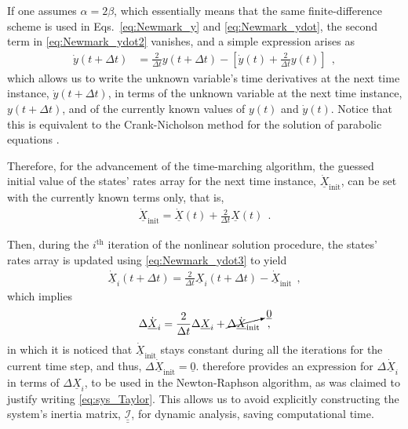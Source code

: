 \documentclass[12pt,a4paper,oneside,english]{abntex2} %
\newcommand{\vect}[1]{\underline{#1}}
\def\tens#1{\underline{\underline{#1}}}
\def\lb{\left[}
\def\rb{\right]}
\def\zv{\vect{0}}
\def\X{\vect{X}}
\def\Xi{\X_i}
\def\Xdot{\dot{\X}}
\def\Xdoti{\dot{\X}_i}
\def\MassSys{\tens{\mathcal{I}}}
\def\dt{\Delta t}
\def\ydot{\dot{y}}
\def\todt{\frac{2}{\dt}}
\def\dt{\Delta t}
\begin{document}
If one assumes $\alpha = 2\beta$, which essentially means that the same finite-difference scheme is used in Eqs.~\eqref{eq:Newmark_y} and \eqref{eq:Newmark_ydot}, the second term in \cref{eq:Newmark_ydot2} vanishes, and a simple expression arises as
\begin{align}
    \ydot(t+\dt) &= \todt y(t+\dt) - \lb \ydot(t) + \todt y(t) \rb \ \ ,
    \label{eq:Newmark_ydot3}
\end{align}
which allows us to write the unknown variable's time derivatives at the next time instance, $\ydot(t+\dt)$, in terms of the unknown variable at the next time instance, $y(t+\dt)$, and of the currently known values of $y(t)$ and $\ydot(t)$. Notice that this is equivalent to the Crank-Nicholson method for the solution of parabolic equations \cite{reddy2014introduction}.

Therefore, for the advancement of the time-marching algorithm, the guessed initial value of the states' rates array for the next time instance, $\Xdot_{\text{init}}$, can be set with the currently known terms only, that is,
\begin{align}
    \Xdot_{\text{init}} =  \Xdot(t)+\todt\X(t) \ \ .
    \label{eq:Xdot_init}
\end{align}

Then, during the $i^{\text{th}}$ iteration of the nonlinear solution procedure, the states' rates array is updated using \cref{eq:Newmark_ydot3} to yield
\begin{align}
    \Xdoti(t+\dt) = \todt\Xi(t+\dt) - \Xdot_{\text{init}} \ \ ,
    \label{eq:Xdot_update}
\end{align}
which implies
\begin{align}
    \Delta\Xdoti = \todt\Delta\Xi + \cancelto{\zv}{\Delta\Xdot_{\text{init}}} \ \ ,
    \label{eq:DeltaXdoti}
\end{align}
in which it is noticed that $\Xdot_{\text{init}}$ stays constant during all the iterations for the current time step, and thus, $\Delta\Xdot_{\text{init}} = \zv $.  therefore provides an expression for $\Delta\Xdoti$ in terms of $\Delta\Xi$, to be used in the Newton-Raphson algorithm, as was claimed to justify writing \cref{eq:sys_Taylor}. This allows us to avoid explicitly constructing the system's inertia matrix, $\MassSys$, for dynamic analysis, saving computational time.
\end{document}
